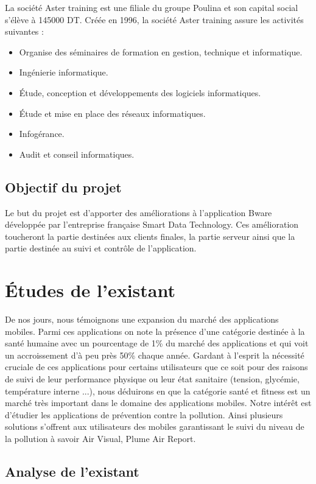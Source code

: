 \qquad La société Aster training est une filiale du groupe Poulina et son capital social s’élève à 145000 DT. Créée en 1996, la société Aster training assure les activités suivantes :
\begin{itemize}
	\item Organise des séminaires de formation en gestion, technique et informatique.
	\item Ingénierie informatique.
	\item Étude, conception et développements des logiciels informatiques.
	\item Étude et mise en place des réseaux informatiques.
	\item Infogérance.
	\item Audit et conseil informatiques.
\end{itemize}

\subsection{Objectif du projet}

\qquad Le but du projet est d'apporter des améliorations à l'application Bware développée par l'entreprise française Smart Data Technology. Ces amélioration toucheront la partie destinées aux clients finales, la partie serveur ainsi que la partie destinée au suivi et contrôle de l'application.

\section{Études de l'existant}

\qquad De nos jours, nous témoignons une expansion du marché des applications mobiles. Parmi ces applications on note la présence d'une catégorie destinée à la santé humaine avec un pourcentage de 1\% du marché des applications et qui voit un accroissement d'à peu près 50\% chaque année. Gardant à l'esprit la nécessité cruciale de ces applications pour certains utilisateurs que ce soit pour des raisons de suivi de leur performance physique ou leur état sanitaire (tension, glycémie, température interne ...), nous déduirons en que la catégorie santé et fitness est un marché très important dans le domaine des applications mobiles. Notre intérêt est d'étudier les applications de prévention contre la pollution. Ainsi plusieurs solutions s'offrent aux utilisateurs des mobiles garantissant le suivi du niveau de la pollution à savoir Air Visual, Plume Air Report.

\subsection{Analyse de l'existant}


